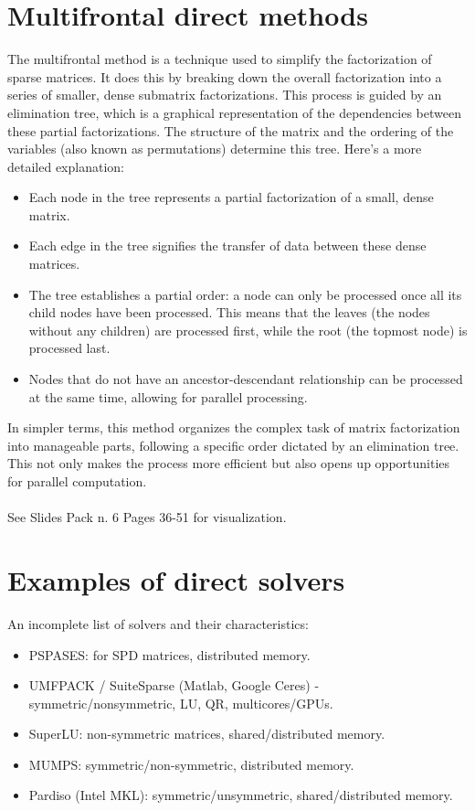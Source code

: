 \documentclass[11pt]{book}
\begin{document}
\section*{Multifrontal direct methods}
The multifrontal method is a technique used to simplify the factorization of sparse matrices. It does this by breaking down the overall factorization into a series of smaller, dense submatrix factorizations. 
This process is guided by an elimination tree, which is a graphical representation of the dependencies between these partial factorizations. The structure of the matrix and the ordering of the variables (also known as permutations) determine this tree.
Here's a more detailed explanation:
\begin{itemize}
\item  Each node in the tree represents a partial factorization of a small, dense matrix.
\item  Each edge in the tree signifies the transfer of data between these dense matrices.
\item The tree establishes a partial order: a node can only be processed once all its child nodes have been processed. This means that the leaves (the nodes without any children) are processed first, while the root (the topmost node) is processed last.
\item Nodes that do not have an ancestor-descendant relationship can be processed at the same time, allowing for parallel processing.
\end{itemize}
In simpler terms, this method organizes the complex task of matrix factorization into manageable parts, following a specific order dictated by an elimination tree. This not only makes the process more efficient but also opens up opportunities for parallel computation.\\ \\
See Slides Pack n. 6 Pages 36-51 for visualization.

\section*{Examples of direct solvers}
An incomplete list of solvers and their characteristics:

\begin{itemize}
  \item PSPASES: for SPD matrices, distributed memory.

  \item UMFPACK / SuiteSparse (Matlab, Google Ceres) - symmetric/nonsymmetric, LU, QR, multicores/GPUs.

  \item SuperLU: non-symmetric matrices, shared/distributed memory.

  \item MUMPS: symmetric/non-symmetric, distributed memory.

  \item Pardiso (Intel MKL): symmetric/unsymmetric, shared/distributed memory.

\end{itemize}
\end{document}
